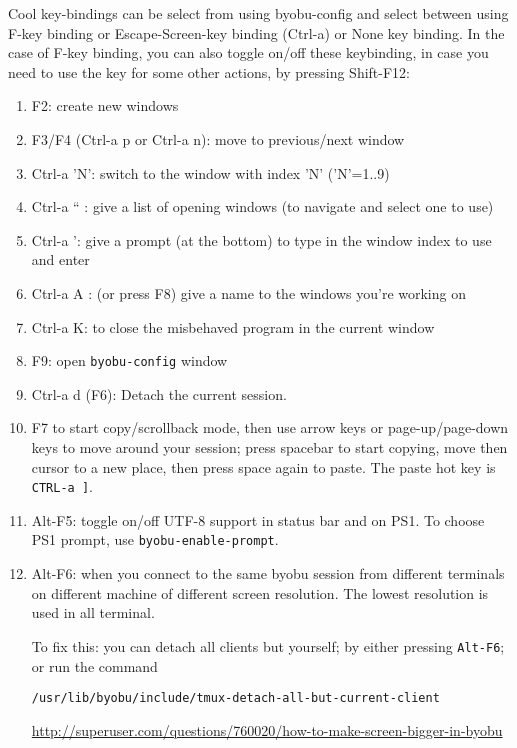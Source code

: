 Cool key-bindings can be select from using byobu-config and select between using
F-key binding or Escape-Screen-key binding (Ctrl-a) or None key binding. In the
case of F-key binding, you can also toggle on/off these keybinding, in case you need to
use the key for some other actions, by pressing Shift-F12:
\begin{enumerate}
  \item F2: create new windows
  \item F3/F4 (Ctrl-a p or Ctrl-a n): move to previous/next window
  \item Ctrl-a 'N': switch to the window with index 'N' ('N'=1..9)
  \item Ctrl-a `` : give a list of opening windows (to navigate and select one
  to use)
  \item Ctrl-a ': give a prompt (at the bottom) to type in the window index
  to use and enter
  \item Ctrl-a A : (or press F8) give a name to the windows you're working on
  \item Ctrl-a K: to close the misbehaved program in the current window
  \item F9: open \verb!byobu-config! window
  \item Ctrl-a d (F6): Detach the current session. 
  \item F7 to start copy/scrollback mode, then use arrow keys or
  page-up/page-down keys to move around your session; press spacebar to start
  copying, move then cursor to a new place, then press space again to paste. The
  paste hot key is \verb!CTRL-a ]!.
  
  \item Alt-F5: toggle on/off UTF-8 support in status bar and on PS1. To choose
  PS1 prompt, use \verb!byobu-enable-prompt!.
  
  
  \item Alt-F6: when you connect to the same byobu session from different
  terminals on different machine of different screen resolution. The lowest
  resolution is used in all terminal.
  
  
  To fix this: you can detach all clients but yourself; by either pressing
  \verb!Alt-F6!; or run the command 
\begin{verbatim}
/usr/lib/byobu/include/tmux-detach-all-but-current-client
\end{verbatim}
\url{http://superuser.com/questions/760020/how-to-make-screen-bigger-in-byobu}
\end{enumerate}

